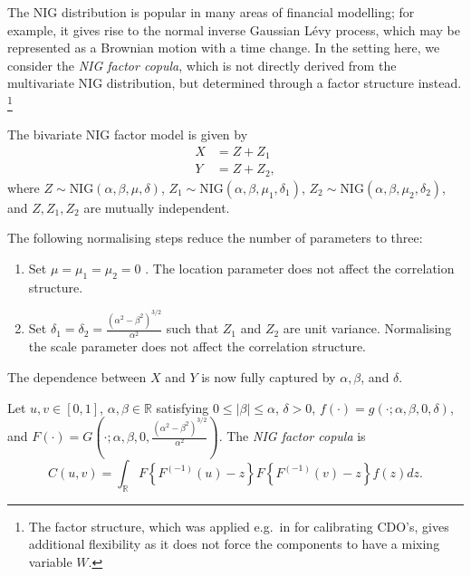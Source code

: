 \documentclass[11pt,a4paper,english]{article}
\begin{document}
The NIG distribution is popular in many areas of
financial modelling; for example, it gives rise 
to the normal inverse Gaussian L\'evy process, which may be represented
as a Brownian motion with a time change.
In the setting here, we consider the {\em NIG factor copula}, which is
not directly derived from the multivariate NIG distribution, but
determined through a factor structure instead. \footnote{The factor structure,
which was applied e.g.\ in \citep{Kalemanova2007} for calibrating CDO's,
gives additional flexibility as it does not force the components to
have a mixing variable $W$.}

The bivariate NIG factor model is given by
\begin{align*}
  X &= Z + Z_1 \\ 
  Y &= Z + Z_2,
  \end{align*}
where $Z \sim \text{NIG}(\alpha, \beta, \mu, \delta)$, $Z_1 \sim \text{NIG}(\alpha, \beta, \mu_1, \delta_1)$, 
$Z_2 \sim \text{NIG}(\alpha, \beta, \mu_2, \delta_2)$, and $Z, Z_1, Z_2$ are mutually independent. 

The following normalising steps reduce the number of parameters to three:
\begin{enumerate}
  \item Set $\mu = \mu_1= \mu_2 = 0$ . The location parameter does not affect the correlation structure.
  \item Set $\delta_1 = \delta_2 = \frac{(\alpha^2-\beta^2)^{3/2}}{\alpha^2}$ such that $Z_1$ and $Z_2$ are unit variance. 
  Normalising the scale parameter does not affect the correlation structure.
\end{enumerate}

The dependence between $X$ and $Y$ is now fully captured by $\alpha, \beta$, and $\delta$.  

\begin{prop}
  Let $u,v \in [0,1]$,
  $\alpha, \beta \in \mathbb{R}$ satisfying $0 \leq |\beta| \leq \alpha$, $\delta >0 $,
  $f(\cdot) = g\left(\cdot; \alpha, \beta, 0, \delta \right)$, 
  and $F (\cdot) = G\left(\cdot; \alpha, \beta, 0, \frac{(\alpha^2-\beta^2)^{3/2}}{\alpha^2}\right)$.
  The {\em NIG factor copula} is 
  \begin{equation*}
    C(u,v) = \int_\mathbb{R} F\left\{F^{(-1)}(u)-z\right\}
    F\left\{F^{(-1)}(v)-z\right\}f(z)dz.
  \end{equation*}

\end{prop}
\end{document}
